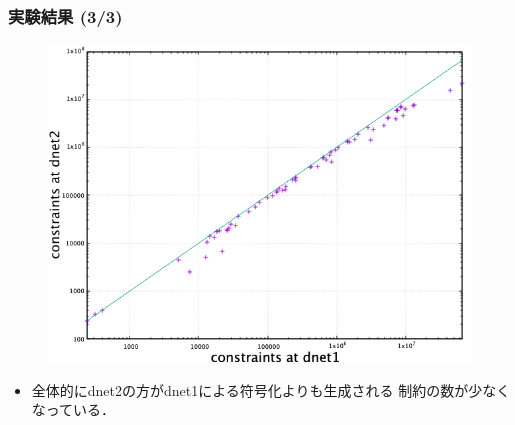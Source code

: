 \documentclass[dvipdfmx,11pt]{beamer}
\begin{document}
\begin{frame}\frametitle{実験結果 (3/3)}
 \begin{figure}[h]
  \centering
  \includegraphics[scale=0.4]{constraints.png}
 \end{figure}

 \begin{itemize}
  \item 全体的にdnet2の方がdnet1による符号化よりも生成される
		制約の数が少なくなっている．
 \end{itemize}
\end{frame}
\end{document}
